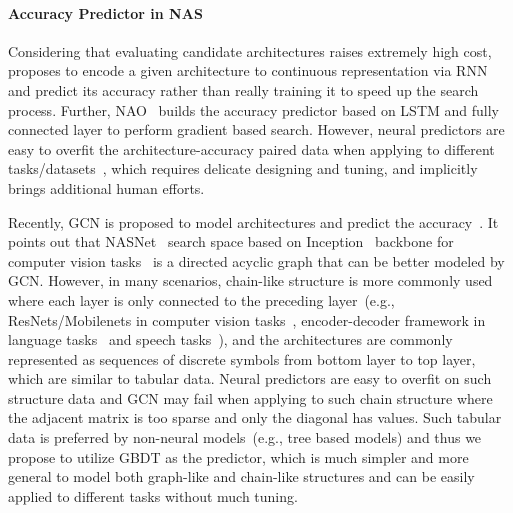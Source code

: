 \documentclass{article}
\begin{document}
\paragraph{Accuracy Predictor in NAS}
Considering that evaluating candidate architectures raises extremely high cost,~\cite{perfpred} proposes to encode a given architecture to continuous representation via RNN and predict its accuracy rather than really training it to speed up the search process. Further, NAO~\cite{nao} builds the accuracy predictor based on LSTM and fully connected layer to perform gradient based search. However, neural predictors are easy to overfit the architecture-accuracy paired data when applying to different tasks/datasets~\cite{nao,neuralpredictor}, which requires delicate designing and tuning, and implicitly brings additional human efforts.

Recently, GCN is proposed to model architectures and predict the accuracy~\cite{neuralpredictor,npenas}. It points out that NASNet~\cite{nasnet} search space based on Inception~\cite{inceptionv1} backbone for computer vision tasks~\cite{nasnet,enas,darts} is a directed acyclic graph that can be better modeled by GCN. However, in many scenarios, chain-like structure is more commonly used where each layer is only connected to the preceding layer~(e.g., ResNets/Mobilenets in computer vision tasks~\cite{designspace,proxylessnas,efficientnet,onceforall,bignas}, encoder-decoder framework in language tasks~\cite{transformer,dynabert} and speech tasks~\cite{transformertts,seminas}), and the architectures are commonly represented as sequences of discrete symbols from bottom layer to top layer, which are similar to tabular data. Neural predictors are easy to overfit on such structure data and GCN may fail when applying to such chain structure where the adjacent matrix is too sparse and only the diagonal has values. Such tabular data is preferred by non-neural models~(e.g., tree based models) and thus we propose to utilize GBDT as the predictor, which is much simpler and more general to model both graph-like and chain-like structures and can be easily applied to different tasks without much tuning.
\end{document}
